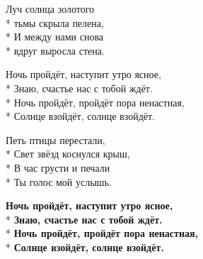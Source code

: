 \medskip

\begin{minipage}{\linewidth}
Луч солнца золотого\\*
тьмы скрыла пелена,\\*
И между нами снова\\*
вдруг выросла стена.\\
\end{minipage}\par\medskip\nobreak

\medskip

\begin{minipage}{\linewidth}
\hspace*{1.5em}Ночь пройдёт, наступит утро ясное,\\*
\hspace*{1.5em}Знаю, счастье нас с тобой ждёт.\\*
\hspace*{1.5em}Ночь пройдёт, пройдёт пора ненастная,\\*
\hspace*{1.5em}Солнце взойдёт, солнце взойдёт.\\
\end{minipage}\par\medskip\nobreak

\medskip

\begin{minipage}{\linewidth}
Петь птицы перестали,\\*
Свет звёзд коснулся крыш,\\*
В час грусти и печали\\*
Ты голос мой услышь.\\
\end{minipage}\par\medskip\nobreak

\medskip

\begin{minipage}{\linewidth}
\hspace*{1.5em}\textbf{Ночь пройдёт, наступит утро ясное,}\\*
\hspace*{1.5em}\textbf{Знаю, счастье нас с тобой ждёт.}\\*
\hspace*{1.5em}\textbf{Ночь пройдёт, пройдёт пора ненастная,}\\*
\hspace*{1.5em}\textbf{Солнце взойдёт, солнце взойдёт.}\\
\end{minipage}\par\medskip\nobreak

